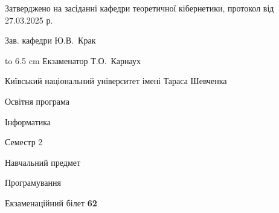 \documentclass[12pt, ukrainian]{article}
\begin{document}
{\smallskip\smallskip \begin {scriptsize} Затверджено на засіданні кафедри теоретичної кібернетики, протокол   від   27.03.2025 р.\par\smallskip\smallskip\smallskip\smallskip
{\parbox {6.5 cm} {Зав. кафедри \dotfill Ю.В.~Крак}}\hspace {0.7cm} {\hbox to 6.5 cm { Екзаменатор \dotfill Т.О.~Карнаух}} \end{scriptsize}}
\newpage
{{\begin {scriptsize}\par
{ \center  Київський національний університет імені Тараса Шевченка \par}
{\parbox {5 cm}{Освітня програма \hfill}{\parbox {7 cm}{Інформатика\hfill}}\parbox {6 cm}{\hfill Семестр 2}}\par
{\parbox {5 cm} {Навчальний предмет \hfill}\parbox {7 cm}{Програмування \hfill}\parbox {6cm}{\hfill}\par}\vspace{-15pt} \end{scriptsize}}{\center Екзаменаційний білет \No \textbf { 62 }\par}}
\end{document}
